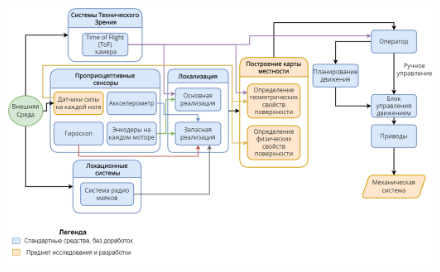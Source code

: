 \documentclass[aspectratio=169,xcolor=table,10pt]{beamer}
\newcommand{\fbckg}[1]{\usebackgroundtemplate{\texttt{[image: \#1]}}}%
\begin{document}

\usebackgroundtemplate{}
\begin{frame}[t]{}
    \framesubtitle{}
    \vspace{-0.4cm}
    \begin{figure}[H]
        \centering\includegraphics[height=12cm,width=1\textwidth,keepaspectratio]{main_diag_hor.png}
        \label{fig:main_diag_hor.png}
    \end{figure}
\end{frame}
\fbckg{fibeamer/figs/common.png}
\end{document}

